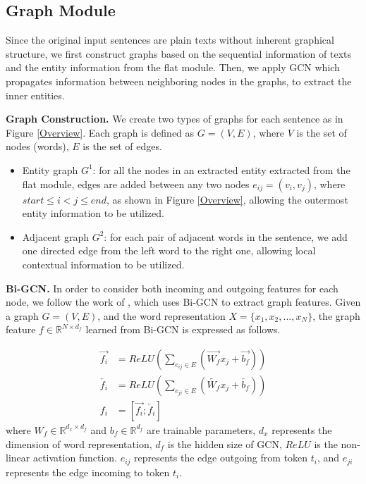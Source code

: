 \documentclass[11pt,a4paper]{article}
\begin{document}
\subsection{Graph Module}
Since the original input sentences are plain texts without inherent graphical structure, we first construct graphs based on the sequential information of texts and the entity information from the flat module.
Then, we apply GCN \cite{kipf2016semi, qian2018graphie} which propagates information between neighboring nodes in the graphs, to extract the inner entities.

\textbf{Graph Construction.}
We create two types of graphs for each sentence as in Figure \ref{Overview}. Each graph is defined as $G=(V, E)$, where $V$ is the set of nodes (words), $E$ is the set of edges.
\begin{itemize}
    \item Entity graph $G^1$: for all the nodes in an extracted entity extracted from the flat module, edges are added between any two nodes $e_{ij} = (v_i, v_j)$, where $ start \le i < j \le end$, as shown in Figure \ref{Overview}, allowing the outermost entity information to be utilized.
    \item Adjacent graph $G^2$: for each pair of adjacent words in the sentence, we add one directed edge from the left word to the right one, allowing local contextual information to be utilized.
\end{itemize}

\textbf{Bi-GCN.}
In order to consider both incoming and outgoing features for each node, we follow the work of \cite{marcheggiani2017encoding, fu2019graphrel}, which uses Bi-GCN to extract graph features. 
Given a graph $G = (V, E)$, and the word representation $X = \{x_1, x_2,..., x_N\}$, the graph feature $f \in \mathbb{R}^{N \times d_f}$ learned from Bi-GCN is expressed as follows.

\begin{equation}
    \begin{aligned}
        \overrightarrow{f_i} &= ReLU(\sum_{{e_{ij}} \in E }(\overrightarrow{W_f}x_j+ \overrightarrow{b_f})) \\
        \overleftarrow{f_i} &= ReLU(\sum_{{e_{ji}} \in E }(\overleftarrow{W_f}x_j+ \overleftarrow{b_f})) \\ 
        f_i &= [\overrightarrow{f_i}; \overleftarrow{f_i}]
    \end{aligned}
\end{equation}
where $W_f \in \mathbb{R}^{d_x \times d_f }$ and $b_f \in \mathbb{R}^{d_f}$ are trainable parameters, $d_x$ represents the dimension of word representation, $d_f$ is the hidden size of GCN, $ReLU$ is the non-linear activation function. ${e_{ij}}$ represents the edge outgoing from token $t_i$, and ${e_{ji}}$ represents the edge incoming to token $t_i$. 
\end{document}
